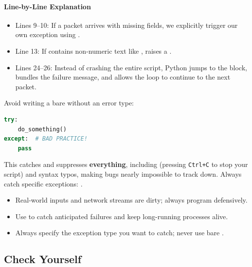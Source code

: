 \paragraph{Line-by-Line Explanation}
\begin{itemize}
    \item Lines 9--10: If a packet arrives with missing fields, we explicitly trigger our own exception using .
    \item Line 13: If  contains non-numeric text like ,  raises a .
    \item Lines 24--26: Instead of crashing the entire script, Python jumps to the  block, bundles the failure message, and allows the loop to continue to the next packet.
\end{itemize}

\begin{warning}
Avoid writing a bare  without an error type:
\begin{lstlisting}[language=Python]
try:
    do_something()
except:  # BAD PRACTICE!
    pass
\end{lstlisting}
This catches and suppresses \textbf{everything}, including  (pressing \texttt{Ctrl+C} to stop your script) and syntax typos, making bugs nearly impossible to track down. Always catch specific exceptions: .
\end{warning}

\begin{takeaways}
\begin{itemize}
    \item Real-world inputs and network streams are dirty; always program defensively.
    \item Use  to catch anticipated failures and keep long-running processes alive.
    \item Always specify the exception type you want to catch; never use bare .
\end{itemize}
\end{takeaways}

\subsection{Check Yourself}


